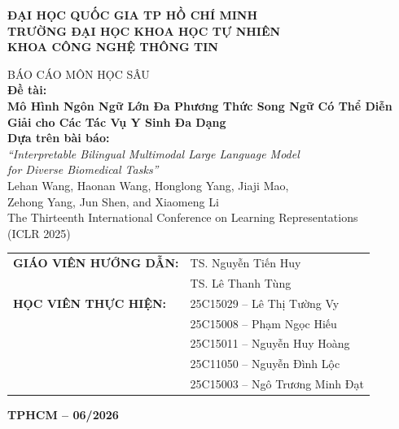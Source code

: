 \documentclass[12pt,a4paper,oneside]{extarticle}
\begin{document}
\begin{titlepage}
\begin{center}

{\large\bfseries ĐẠI HỌC QUỐC GIA TP HỒ CHÍ MINH}\\[2pt]
{\large\bfseries TRƯỜNG ĐẠI HỌC KHOA HỌC TỰ NHIÊN}\\[2pt]
{\large\bfseries KHOA CÔNG NGHỆ THÔNG TIN}\\[0.5cm]

\vspace{0.5cm}

{\large BÁO CÁO MÔN HỌC SÂU}\\[6pt]

{\Large\bfseries Đề tài:}\\[8pt]
{\LARGE\bfseries Mô Hình Ngôn Ngữ Lớn Đa Phương Thức Song Ngữ Có Thể Diễn Giải cho Các Tác Vụ Y Sinh Đa Dạng}\\[1.2cm]
{\large\bfseries Dựa trên bài báo:}\\[2pt]
{\large\itshape ``Interpretable Bilingual Multimodal Large Language Model\\
for Diverse Biomedical Tasks''}\\[2pt]
{\large Lehan Wang, Haonan Wang, Honglong Yang, Jiaji Mao,\\
Zehong Yang, Jun Shen, and Xiaomeng Li}\\[2pt]
{\normalsize The Thirteenth International Conference on Learning Representations\\
(ICLR 2025)}\\[1cm]

\begin{flushleft}
\hspace{2cm}\begin{tabular}{ll}
\textbf{GIÁO VIÊN HƯỚNG DẪN:}   & TS. Nguyễn Tiến Huy \\
                                & TS. Lê Thanh Tùng\\[8pt]

\textbf{HỌC VIÊN THỰC HIỆN:}  & 25C15029 -- Lê Thị Tường Vy\\
                              & 25C15008 -- Phạm Ngọc Hiếu\\
                              & 25C15011 -- Nguyễn Huy Hoàng\\
                              & 25C11050 -- Nguyễn Đình Lộc\\
                              & 25C15003 -- Ngô Trương Minh Đạt\\
\end{tabular}
\end{flushleft}

\vfill
{\bfseries TPHCM -- 06/2026}

\end{center}
\end{titlepage}
\end{document}
